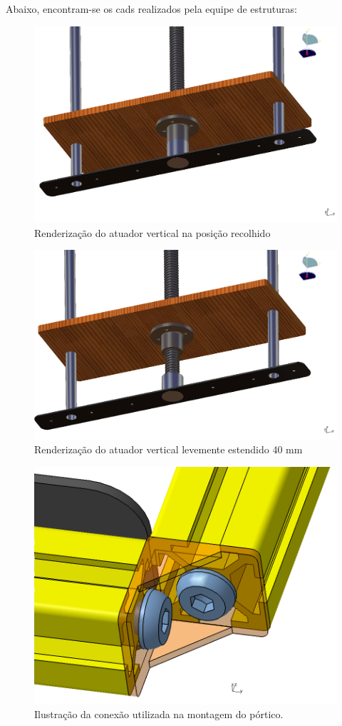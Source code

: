 Abaixo, encontram-se os cads realizados pela equipe de estruturas:
\begin{figure}[!h]		
\centering 
\includegraphics[scale=0.4]{figuras/screen_1}
\caption{Renderização do atuador vertical na posição recolhido}
\end{figure}
\FloatBarrier

\begin{figure}[!h]		
\centering
\includegraphics[scale=0.4]{figuras/screen_2}
\caption{Renderização do atuador vertical levemente estendido 40 mm}
\end{figure}
\FloatBarrier


\begin{figure}[!h]		
\centering
\includegraphics[scale=0.4]{figuras/screen_3}
\caption{Ilustração da conexão utilizada na montagem do pórtico.}
\end{figure}
\FloatBarrier

